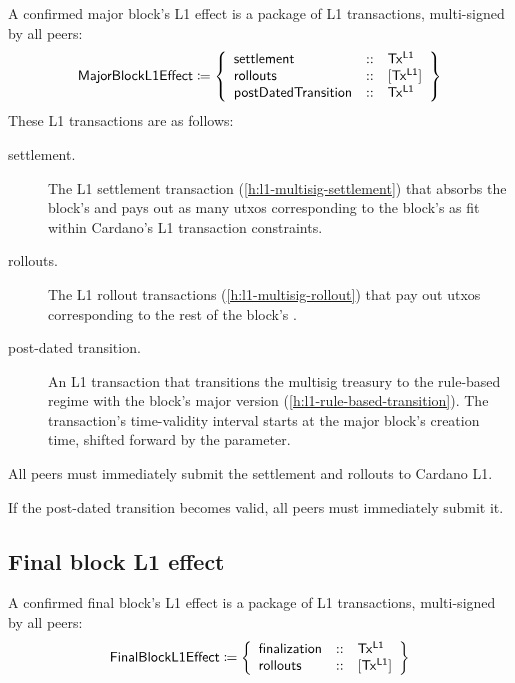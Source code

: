 \documentclass[../hydrozoa.tex]{subfiles}
\begin{document}
A confirmed major block's L1 effect is a package of L1 transactions, multi-signed by all peers:
\begin{equation*}
  \mathsf{MajorBlockL1Effect} \coloneq \left\{
  \begin{array}{lll}
    \mathsf{settlement} &::& \mathsf{Tx^{L1}} \\
    \mathsf{rollouts} &::& [\mathsf{Tx^{L1}}] \\
    \mathsf{postDatedTransition} &::& \mathsf{Tx^{L1}}
  \end{array}\right\}
\end{equation*}
These L1 transactions are as follows:
\begin{description}
  \item[settlement.] The L1 settlement transaction (\cref{h:l1-multisig-settlement}) that absorbs the block's  and pays out as many utxos corresponding to the block's  as fit within Cardano's L1 transaction constraints.
  \item[rollouts.] The L1 rollout transactions (\cref{h:l1-multisig-rollout}) that pay out utxos corresponding to the rest of the block's .
  \item[post-dated transition.] An L1 transaction that transitions the multisig treasury to the rule-based regime with the block's major version (\cref{h:l1-rule-based-transition}).
    The transaction's time-validity interval starts at the major block's creation time, shifted forward by the  parameter.
\end{description}

All peers must immediately submit the settlement and rollouts to Cardano L1.

If the post-dated transition becomes valid, all peers must immediately submit it.

\subsection{Final block L1 effect}%
\label{h:l2-block-effect-final-block}%

A confirmed final block's L1 effect is a package of L1 transactions, multi-signed by all peers:
\begin{equation*}
  \mathsf{FinalBlockL1Effect} \coloneq \left\{
  \begin{array}{lll}
    \mathsf{finalization} &::& \mathsf{Tx^{L1}} \\
    \mathsf{rollouts} &::& [\mathsf{Tx^{L1}}] \\
  \end{array}\right\}
\end{equation*}
\end{document}
